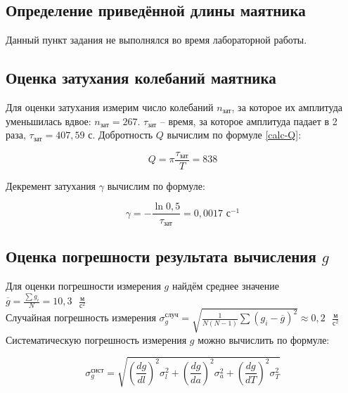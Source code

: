 \documentclass[a4paper,12pt]{article}
\begin{document}
\subsection{Определение приведённой длины маятника}

Данный пункт задания не выполнялся во время лабораторной работы.

\subsection{Оценка затухания колебаний маятника}

Для оценки затухания измерим число колебаний $n_\text{зат}$, за которое их амплитуда уменьшилась вдвое: $n_\text{зат} = 267$. $\tau_\text{зат}$ -- время, за которое амплитуда падает в 2 раза, $\tau_\text{зат} = 407,59 \text{ с}$. Добротность $Q$ вычислим по формуле \eqref{calc-Q}:

\begin{equation}
    Q = \pi \frac{\tau_\text{зат}}{T} = 838
\end{equation}

Декремент затухания $\gamma$ вычислим по формуле:

\begin{equation}
    \gamma = - \frac{\ln{0,5}}{\tau_\text{зат}} = 0,0017 \text{ с} ^ {-1}
\end{equation}

\subsection{Оценка погрешности результата вычисления $g$}

Для оценки погрешности измерения $g$ найдём среднее значение $\overline{g} = \frac{\sum{g_i}}{N} = 10,3 \text{ } \frac{\text{м}}{\text{с}^2}$ \\

Случайная погрешность измерения $ \sigma_{g}^\text{случ} = \sqrt{\frac{1}{N  (N-1)}\sum(g_i -\overline{g})^2} \approx 0,2 \text{ } \frac{\text{м}}{\text{с}^2}$ \\

Систематическую погрешность измерения $g$ можно вычислить по формуле:

\begin{equation}
    \sigma_{g}^\text{сист} = \sqrt{
    \left( \frac{d g}{d l}  \right) ^ 2 \sigma_{l} ^ 2 + 
    \left( \frac{d g}{d a}  \right) ^ 2 \sigma_{a} ^ 2 + 
    \left( \frac{d g}{d T}  \right) ^ 2 \sigma_{T} ^ 2
    }
\end{equation}
\end{document}
